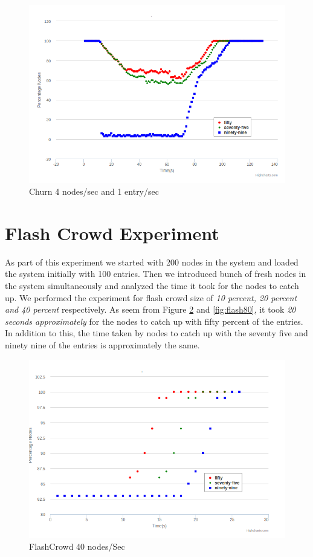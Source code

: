 \documentclass[12pt,a4paper,twoside,openright]{book}
\begin{document}
\begin{figure}[h]
	\includegraphics[scale=0.5]{200-4Node-1Entry}
	\caption{Churn 4 nodes/sec and 1 entry/sec}
	\label{fig:churn}
\end{figure}

\section{Flash Crowd Experiment}
As part of this experiment we started with 200 nodes in the system and loaded the system initially with 100 entries. Then we introduced bunch of fresh nodes in the system simultaneously and analyzed the time it took for the nodes to catch up. We performed the experiment for flash crowd size of \textit{10 percent, 20 percent and 40 percent} respectively. As seem from Figure \ref{fig:flash40} and \ref{fig:flash80}, it took \textit{20 seconds approximately} for the nodes to catch up with fifty percent of the entries. In addition to this, the time taken by nodes to catch up with the seventy five and ninety nine of the entries is approximately the same. 

\begin{figure}[h]
	\includegraphics[scale=0.5]{200-40Nodes}
	\caption{FlashCrowd 40 nodes/Sec }
	\label{fig:flash40}
\end{figure}
\end{document}
